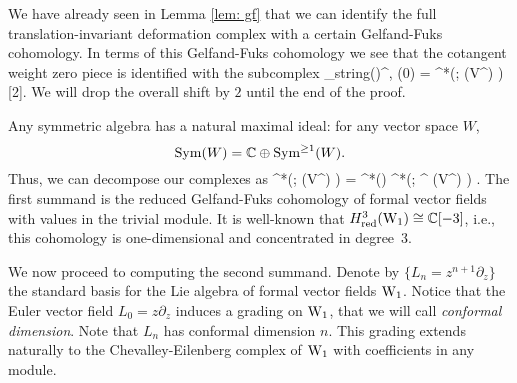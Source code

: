 

We have already seen in Lemma \ref{lem: gf} that we can identify the full translation-invariant deformation complex with a certain Gelfand-Fuks cohomology. 
In terms of this Gelfand-Fuks cohomology we see that the cotangent weight zero piece is identified with the subcomplex
\ben
\Def_{\rm string}(\CC)^{\CC, \wt(0)} = \cred^*\left(\wone ; \Sym(V^\vee[z^\vee]) \right) [2]. 
\een 
We will drop the overall shift by $2$ until the end of the proof. 

Any symmetric algebra has a natural maximal ideal: 
for any vector space $W$,
\[
{\rm Sym}(W) = \mathbb C \oplus {\rm Sym}^{\geq 1}(W).
\] 
Thus, we can decompose our complexes as
\ben
 \cred^*\left(\wone ; \Sym(V^\vee[z^\vee]) \right) =   \cred^*(\wone) \oplus \clie^*\left(\wone ; \Sym^{} (V^\vee[z^\vee]) \right) .
 \een
The first summand is the reduced Gelfand-Fuks cohomology of formal vector fields with values in the trivial module.
It is well-known that $H^3_{\rm red} ({\rm W}_1) \cong \mathbb C[-3]$, 
i.e., this cohomology is one-dimensional and concentrated in degree~$3$. 

We now proceed to computing the second summand. 
Denote by $\{L_n = z^{n+1} \partial_z\}$ the standard basis for the Lie algebra of formal vector fields ${\rm W}_1$. 
Notice that the Euler vector field $L_0 = z \partial_z$ induces a grading on ${\rm W}_1$,
that we will call {\em conformal dimension}.
Note that $L_n$ has conformal dimension $n$. 
This grading extends naturally to the Chevalley-Eilenberg complex of ${\rm W}_1$ with coefficients in any module. 

